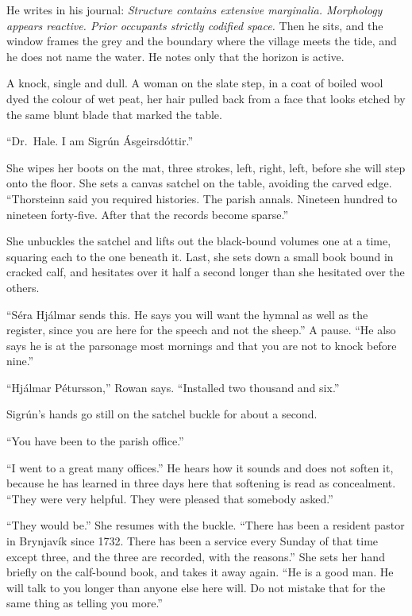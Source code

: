 \documentclass[11pt,oneside]{book}
\newcommand{\sceneline}{%
  \par\vspace{1.2em}
  \begin{center}
    \fontsize{11}{11}\selectfont \textbullet\quad\textbullet\quad\textbullet
  \end{center}
  \vspace{0.6em}\noindent\ignorespaces
}
\begin{document}
He writes in his journal: \emph{Structure contains extensive marginalia.
Morphology appears reactive. Prior occupants strictly codified space.}
Then he sits, and the window frames the grey and the boundary where the
village meets the tide, and he does not name the water. He notes only
that the horizon is active.

\sceneline

A knock, single and dull. A woman on the slate step, in a coat of boiled
wool dyed the colour of wet peat, her hair pulled back from a face that
looks etched by the same blunt blade that marked the table.

``Dr.~Hale. I am Sigrún Ásgeirsdóttir.''

She wipes her boots on the mat, three strokes, left, right, left, before
she will step onto the floor. She sets a canvas satchel on the table,
avoiding the carved edge. ``Thorsteinn said you required histories. The
parish annals. Nineteen hundred to nineteen forty-five. After that the
records become sparse.''

She unbuckles the satchel and lifts out the black-bound volumes one at a
time, squaring each to the one beneath it. Last, she sets down a small
book bound in cracked calf, and hesitates over it half a second longer
than she hesitated over the others.

``Séra Hjálmar sends this. He says you will want the hymnal as well as
the register, since you are here for the speech and not the sheep.'' A
pause. ``He also says he is at the parsonage most mornings and that you
are not to knock before nine.''

``Hjálmar Pétursson,'' Rowan says. ``Installed two thousand and six.''

Sigrún's hands go still on the satchel buckle for about a second.

``You have been to the parish office.''

``I went to a great many offices.'' He hears how it sounds and does not
soften it, because he has learned in three days here that softening is
read as concealment. ``They were very helpful. They were pleased that
somebody asked.''

``They would be.'' She resumes with the buckle. ``There has been a
resident pastor in Brynjavík since 1732. There has been a service every
Sunday of that time except three, and the three are recorded, with the
reasons.'' She sets her hand
briefly on the calf-bound book, and takes it away again. ``He is a good
man. He will talk to you longer than anyone else here will. Do not
mistake that for the same thing as telling you more.''
\end{document}
